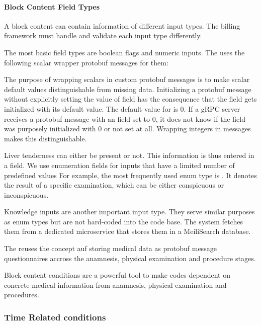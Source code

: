 \paragraph{Block Content Field Types}
A block content can contain information of different input types.
The billing framework must handle and validate each input type differently.

The most basic field types are boolean flags and numeric inputs.
The \AVS uses the following scalar wrapper protobuf messages for them:



The purpose of wrapping scalars in custom protobuf messages is to make scalar default values distinguishable from missing data.
Initializing a protobuf message without explicitly setting the value of field has the consequence that the field gets initialized with its default value.
The default value for  is 0.
If a gRPC server receives a protobuf message with an  field set to 0, it does not know if the field was purposely initialized with 0 or not set at all.
Wrapping integers in  messages makes this distinguishable.


Liver tenderness can either be present or not.
This information is thus entered in a \code{BoolW]} field.
We use enumeration fields for inputs that have a limited number of predefined values
For example, the most frequently used enum type is .
It denotes the result of a specific examination, which can be either conspicuous or inconspicuous.



Knowledge inputs are another important input type.
They serve similar purposes as enum types but are not hard-coded into the code base.
The system fetches them from a dedicated microservice that stores them in a MeiliSearch database.

The \AVS reuses the concept auf storing medical data as protobuf message questionnaires accross the anamnesis, physical examination and procedure stages.

Block content conditions are a powerful tool to make codes dependent on concrete medical information from anamnesis,
physical examination and procedures.


\subsubsection{Time Related conditions}

